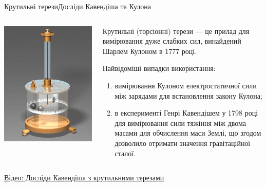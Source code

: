 \documentclass{beamer}
\begin{document}
\begin{frame}{Крутильні терези}{Досліди Кавендіша та Кулона}
	\begin{columns}
		\begin{column}{0.4\linewidth}
			\begin{center}
				\includegraphics[width=\linewidth]{ColumbTorsiomBalance}
			\end{center}
		\end{column}
		\begin{column}{0.6\linewidth}\justifying
			\alert{Крутильні (торсіонні) терези} --- це прилад для вимірювання
			дуже слабких сил,
			винайдений Шарлем Кулоном в 1777 році.

			\medskip

			Найвідоміші випадки  використання:
			\begin{enumerate}\justifying
				\item вимірювання Кулоном електростатичної сили між зарядами
				      для встановлення закону Кулона;
				\item в експерименті Генрі Кавендішем у 1798 році для
				      вимірювання сили тяжіння між двома масами для обчислення маси
				      Землі, що згодом дозволило отримати значення гравітаційної
				      сталої.
			\end{enumerate}
		\end{column}
	\end{columns}
	\vfill

	\href{https://www.youtube.com/watch?v=5pmkBq3eDcw}{\small Відео:
		Досліди Кавендіша з крутильними терезами}
\end{frame}
\end{document}
